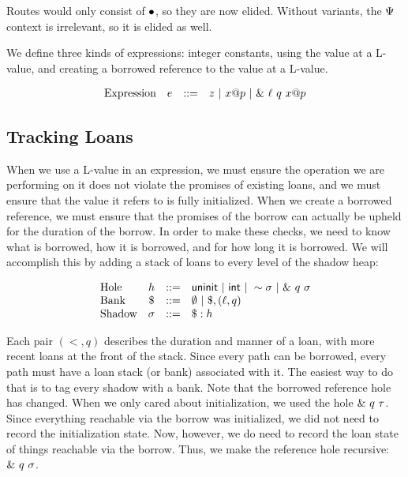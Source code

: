 Routes would only consist of $\bullet$, so they are now elided.
Without variants, the $\Psi$ context is irrelevant, so it is elided as well.

We define three kinds of expressions: integer constants, using the value at a L-value, 
and creating a borrowed reference to the value at a L-value.

\[
\begin{array}{lccl}
\textrm{Expression} & e & ::= & z ~|~ {x}@{p} ~|~ \&~{{\ell}~{q}~{{x}@{p}}}
\end{array}
\]

\subsection*{Tracking Loans}

When we use a L-value in an expression, we must ensure the operation we are performing on it
does not violate the promises of existing loans, and we must ensure that the value it refers
to is fully initialized. When we create a borrowed reference, we must ensure that the
promises of the borrow can actually be upheld for the duration of the borrow.
In order to make these checks, we need to know what is borrowed, how it is borrowed, and for
how long it is borrowed. We will accomplish this by adding a stack of loans to every
level of the shadow heap:

\[
\begin{array}{lccl}
\textrm{Hole} & h & ::= & \mathsf{uninit} ~|~ \mathsf{int} ~|~ \sim{\sigma} ~|~ \&~{{q}~{\sigma}} \\
\textrm{Bank} & \$ & ::= & \emptyset ~|~ \$, (\ell,q) \\
\textrm{Shadow} & \sigma & ::= & \$:h \\
\end{array}
\]

Each pair $(\lt, q)$ describes the duration and manner of a loan, 
with more recent loans at the front of the stack.
Since every path can be borrowed, every path must have a loan stack (or bank) associated with it.
The easiest way to do that is to tag every shadow with a bank.
Note that the borrowed reference hole has changed.
When we only cared about initialization, we used the hole $\&~{{q}~{\tau}}$.
Since everything reachable via the borrow was initialized, we did not need to record
the initialization state.
Now, however, we do need to record the loan state of things reachable via the borrow.
Thus, we make the reference hole recursive: $\&~{{q}~{\sigma}}$.

